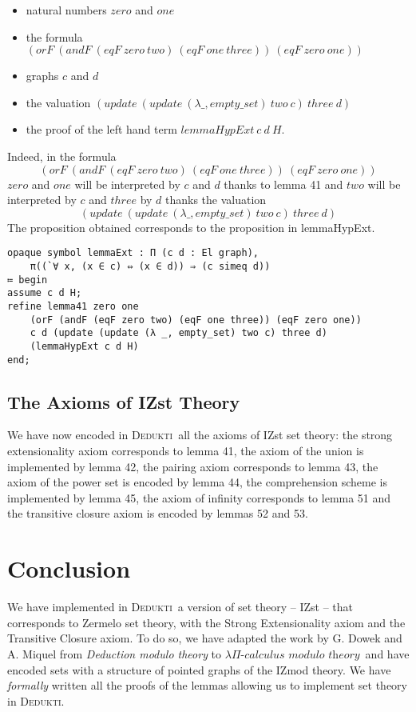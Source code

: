 \documentclass[submission,copyright,creativecommons]{eptcs}
\newcommand{\dedukti}{\textsc{Dedukti}}
\newcommand{\lpcm}{$\lambda \Pi\textit{-calculus modulo theory}$}
\begin{document}
\begin{itemize}
\item natural numbers $zero$ and $one$
\item the formula $(orF~(andF~(eqF~zero~two)~(eqF~one~three))~(eqF~zero~one))$
\item graphs $c$ and $d$
\item the valuation $(update~(update~(\lambda \_, empty\_set)~two~c)~three~d)$ 
\item the proof of the left hand term $lemmaHypExt~c~d~H$.
\end{itemize}

Indeed, in the formula $$(orF~(andF~(eqF~zero~two)~(eqF~one~three))~(eqF~zero~one))$$ $zero$ and $one$ will be interpreted by $c$ and $d$ thanks to lemma 41 and $two$ will be interpreted by $c$ and $three$ by $d$ thanks the valuation $$(update~(update~(\lambda \_, empty\_set)~two~c)~three~d)$$ The proposition obtained corresponds to the proposition in lemmaHypExt.


\begin{lstlisting}
opaque symbol lemmaExt : Π (c d : El graph), 
	π((`∀ x, (x ∈ c) ⇔ (x ∈ d)) ⇒ (c simeq d))
≔ begin
assume c d H;
refine lemma41 zero one 
	(orF (andF (eqF zero two) (eqF one three)) (eqF zero one)) 
	c d (update (update (λ _, empty_set) two c) three d) 
	(lemmaHypExt c d H)
end;
\end{lstlisting}

\subsection{The Axioms of IZst Theory}

We have now encoded in \dedukti ~all the axioms of IZst set theory: the strong extensionality axiom corresponds to lemma 41, the axiom of the union is implemented by lemma 42, the pairing axiom corresponds to lemma 43, the axiom of the power set is encoded by lemma 44, the comprehension scheme is implemented by lemma 45, the axiom of infinity corresponds to lemma 51 and the transitive closure axiom is encoded by lemmas 52 and 53.


\section{Conclusion}

We have implemented in \dedukti ~a version of set theory -- IZst -- that corresponds to Zermelo set theory, with the Strong Extensionality axiom and the Transitive Closure axiom. To do so, we have adapted the work by G. Dowek and A. Miquel \cite{zermodulo} from \textit{Deduction modulo theory} to \lpcm ~and have encoded sets with a structure of pointed graphs of the IZmod theory. We have \textit{formally} written all the proofs of the lemmas allowing us to implement set theory in \dedukti.
\end{document}
